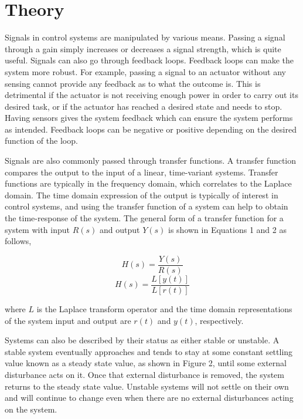 \documentclass[12pt]{article}
\begin{document}
\newpage


\section*{\fontsize{12}{12}\selectfont \large Theory}
Signals in control systems are manipulated by various means. Passing a signal through a gain simply increases or decreases a signal strength, which is quite useful. Signals can also go through feedback loops. Feedback loops can make the system more robust. For example, passing a signal to an actuator without any sensing cannot provide any feedback as to what the outcome is. This is detrimental if the actuator is not receiving enough power in order to carry out its desired task, or if the actuator has reached a desired state and needs to stop. Having sensors gives the system feedback which can ensure the system performs as intended. Feedback loops can be negative or positive depending on the desired function of the loop. 
\bigskip

Signals are also commonly passed through transfer functions. A transfer function compares the output to the input of a linear, time-variant systems. Transfer functions are typically in the frequency domain, which correlates to the Laplace domain. The time domain expression of the output is typically of interest in control systems, and using the transfer function of a system can help to obtain the time-response of the system. The general form of a transfer function for a system with input $R(s)$ and output $Y(s)$ is shown in Equations 1 and 2 as follows,
\bigskip

\begin{equation}
H(s) = \frac{Y(s)}{R(s)} 
\end{equation}
\begin{equation}
H(s) = \frac{L[y(t)]}{L[r(t)]}
\end{equation}
\bigskip

where $L$ is the Laplace transform operator and the time domain representations of the system input and output are $r(t)$ and $y(t)$, respectively.
\bigskip

Systems can also be described by their status as either stable or unstable. A stable system eventually approaches and tends to stay at some constant settling value known as a steady state value, as shown in Figure 2, until some external disturbance acts on it. Once that external disturbance is removed, the system returns to the steady state value. Unstable systems will not settle on their own and will continue to change even when there are no external disturbances acting on the system.
\bigskip
\end{document}
